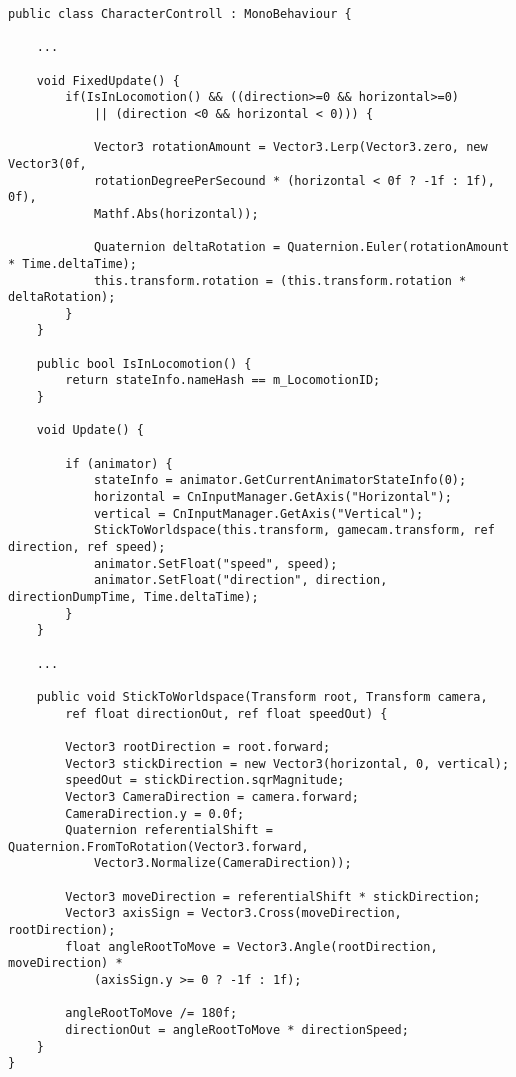 \begin{scriptsize}
\lstset{
	float,
	caption=Skript CharacterController.cs, 
	language=[Sharp]C, 
	frame=single,  
	showstringspaces=false, 
	showspaces=false, 
	numbers=left, 
	captionpos=b, 
	belowcaptionskip=4pt,
	basicstyle=\ttfamily
} 
\newpage
\begin{lstlisting}[label=lst:c_charactercontroller]
public class CharacterControll : MonoBehaviour {

	...	
	
    void FixedUpdate() {
        if(IsInLocomotion() && ((direction>=0 && horizontal>=0) 
        	|| (direction <0 && horizontal < 0))) {
        	
            Vector3 rotationAmount = Vector3.Lerp(Vector3.zero, new Vector3(0f, 
            rotationDegreePerSecound * (horizontal < 0f ? -1f : 1f), 0f), 
            Mathf.Abs(horizontal));
            	
            Quaternion deltaRotation = Quaternion.Euler(rotationAmount * Time.deltaTime);
            this.transform.rotation = (this.transform.rotation * deltaRotation);
        }
    }

    public bool IsInLocomotion() {
        return stateInfo.nameHash == m_LocomotionID;
    }

    void Update() {
    
        if (animator) {
            stateInfo = animator.GetCurrentAnimatorStateInfo(0);
            horizontal = CnInputManager.GetAxis("Horizontal");
            vertical = CnInputManager.GetAxis("Vertical");
            StickToWorldspace(this.transform, gamecam.transform, ref direction, ref speed);
            animator.SetFloat("speed", speed);
            animator.SetFloat("direction", direction, directionDumpTime, Time.deltaTime);
        }
    }
    
    ...

    public void StickToWorldspace(Transform root, Transform camera, 
    	ref float directionOut, ref float speedOut) {
    	
        Vector3 rootDirection = root.forward;
        Vector3 stickDirection = new Vector3(horizontal, 0, vertical);
        speedOut = stickDirection.sqrMagnitude;
        Vector3 CameraDirection = camera.forward;
        CameraDirection.y = 0.0f;
        Quaternion referentialShift = Quaternion.FromToRotation(Vector3.forward, 
        	Vector3.Normalize(CameraDirection));
        	
        Vector3 moveDirection = referentialShift * stickDirection;
        Vector3 axisSign = Vector3.Cross(moveDirection, rootDirection);
        float angleRootToMove = Vector3.Angle(rootDirection, moveDirection) * 
        	(axisSign.y >= 0 ? -1f : 1f);      
        	
        angleRootToMove /= 180f;
        directionOut = angleRootToMove * directionSpeed;
    }
}

\end{lstlisting}
\end{scriptsize}


